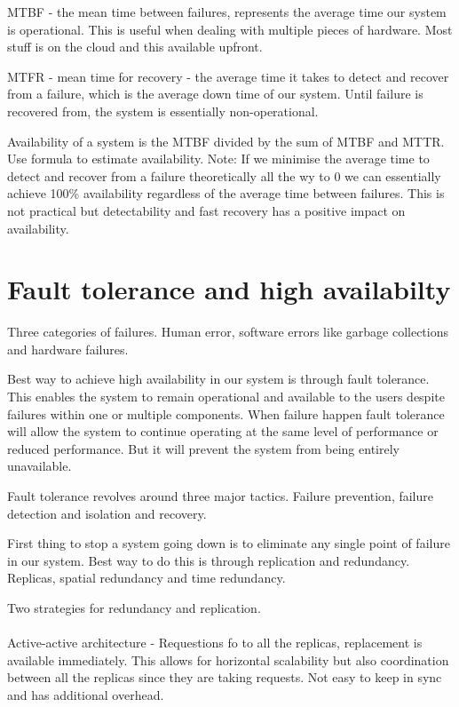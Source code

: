 MTBF - the mean time between failures, represents the average time our system is operational.
This is useful when dealing with multiple pieces of hardware.
Most stuff is on the cloud and this available upfront.

MTFR - mean time for recovery - the average time it takes to detect and recover from a failure, which is the average down time of our system.
Until failure is recovered from, the system is essentially non-operational.

Availability of a system is the MTBF divided by the sum of MTBF and MTTR.
Use formula to estimate availability.
Note: If we minimise the average time to detect and recover from a failure theoretically all the wy to 0 we can essentially achieve 100\%
availability regardless of the average time between failures.
This is not practical but detectability and fast recovery has a positive impact on availability.


\section{Fault tolerance and high availabilty}
Three categories of failures.
Human error, software errors like garbage collections and hardware failures.

Best way to achieve high availability in our system is through fault tolerance.
This enables the system to remain operational and available to the users despite failures within one or multiple components.
When failure happen fault tolerance will allow the system to continue operating at the same level of performance or reduced performance.
But it will prevent the system from being entirely unavailable.

Fault tolerance revolves around three major tactics.
Failure prevention, failure detection and isolation and recovery.

First thing to stop a system going down is to eliminate any single point of failure in our system.
Best way to do this is through replication and redundancy.
Replicas, spatial redundancy and time redundancy.

Two strategies for redundancy and replication.

\paragraph{}
Active-active architecture - Requestions fo to all the replicas, replacement is available immediately.
This allows for horizontal scalability but also coordination between all the replicas since they are taking requests.
Not easy to keep in sync and has additional overhead.

